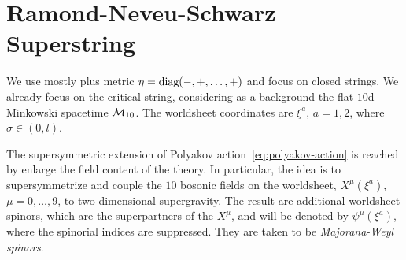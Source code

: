 \section{Ramond-Neveu-Schwarz Superstring}
We use mostly plus metric $\eta = \textup{diag}(-, +, \dots, +)$ and focus on closed strings. We already focus on the critical string, considering as a background the flat $10$d Minkowski spacetime $\mathcal{M}_{10}$. The worldsheet coordinates are $\xi^a$, $a = 1,2$, where $\sigma \in (0,l)$.

The supersymmetric extension of Polyakov action~\eqref{eq:polyakov-action} is reached by enlarge the field content of the theory. In particular, the idea is to supersymmetrize and couple the $10$ bosonic fields on the worldsheet, $X^\mu (\xi^a)$, $\mu = 0, \dots, 9$, to two-dimensional supergravity. The result are additional worldsheet spinors, which are the superpartners of the $X^\mu$, and will be denoted by $\psi^\mu (\xi^a)$, where the spinorial indices are suppressed. They are taken to be \emph{Majorana-Weyl spinors}.

